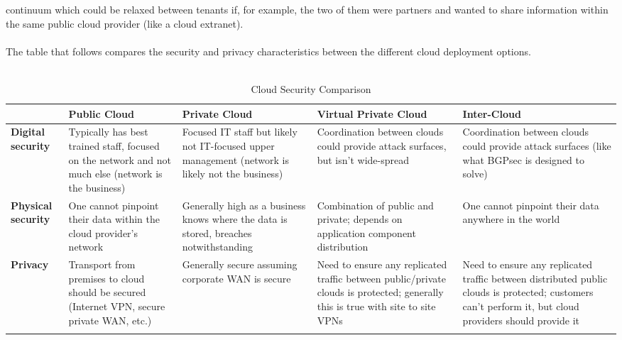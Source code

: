 continuum which could be relaxed between tenants if, for example, the two of
them were partners and wanted to share information within the same public
cloud provider (like a cloud extranet).
\\ \\
The table that follows compares the security and privacy characteristics
between the different cloud deployment options.
\\ \\
\begin{longtable}{LLLLL}
  \toprule
  &
  \textbf{Public Cloud}
  &
  \textbf{Private Cloud}
  &
  \textbf{Virtual Private Cloud}
  &
  \textbf{Inter-Cloud}
  \\ \midrule
  \textbf{Digital security}
  &
  Typically has best trained staff, focused on the network and not much else
  (network is the business)
  &
  Focused IT staff but likely not IT-focused upper management (network is
  likely not the business)
  &
  Coordination between clouds could provide attack surfaces, but isn’t
  wide-spread
  &
  Coordination between clouds could provide attack surfaces (like what BGPsec
  is designed to solve)
  \\ \midrule
  \textbf{Physical security}
  &
  One cannot pinpoint their data within the cloud provider’s network
  &
  Generally high as a business knows where the data is stored, breaches
  notwithstanding
  &
  Combination of public and private; depends on application component
  distribution
  &
  One cannot pinpoint their data anywhere in the world
  \\ \midrule
  \textbf{Privacy}
  &
  Transport from premises to cloud should be secured (Internet VPN, secure
  private WAN, etc.)
  &
  Generally secure assuming corporate WAN is secure
  &
  Need to ensure any replicated traffic between public/private clouds is
  protected; generally this is true with site to site VPNs
  &
  Need to ensure any replicated traffic between distributed public clouds is
  protected; customers can't perform it, but cloud providers should provide it
  \\
  \bottomrule
  \caption{Cloud Security Comparison} \\
\end{longtable}
